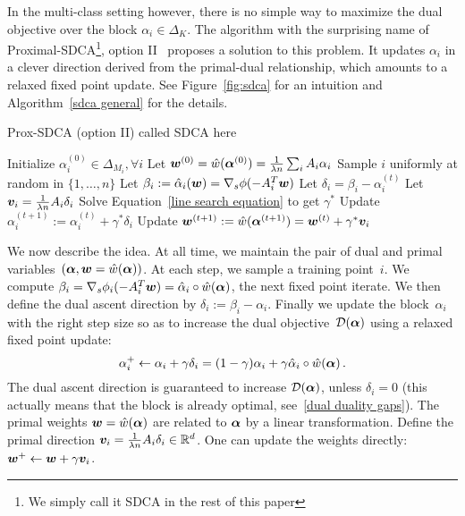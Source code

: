 In the multi-class setting however, there is no simple way to maximize the dual objective over the block $\alpha_i \in \Delta_K$.
The algorithm with the surprising name of Proximal-SDCA\footnote{We simply call it SDCA in the rest of this paper}, option II~\citep{shalev2016accelerated} proposes a solution to this problem.
It updates $\alpha_i$  in a clever direction derived from the primal-dual relationship, which amounts to a relaxed fixed point update. 
See Figure~\ref{fig:sdca} for an intuition 
and Algorithm~\ref{sdca general} for the details.



\begin{algorithm}[t]
    \caption{Prox-SDCA (option II) called SDCA here}%
    \label{sdca general}
	\begin{algorithmic}
        \STATE Initialize $\alpha_i^{(0)} \in \Delta_{M_i}, \forall i$
        \STATE Let $\boldsymbol{w}^{(0)} = \hat{w}(\bm{\alpha}^{(0)}) = \frac{1}{\lambda n} \sum_i A_i \alpha_i$
                \STATE Sample $i$ uniformly at random in $\{1,\ldots,n\}$
                \STATE Let $ \beta_i := \hat{\alpha}_i(\boldsymbol{w}) = \nabla_s \phi(-A_i^T \boldsymbol{w})$
                \STATE Let $\delta_i = \beta_i - \alpha_i^{(t)}$ 
                \STATE Let $\bm v_i = \frac{1}{\lambda n} A_i \delta_i $ 
                \STATE Solve Equation~\eqref{line search equation} to get $\gamma^*$ 
               \STATE Update $\alpha_i^{(t+1)} := \alpha_i^{(t)} + \gamma^* \delta_i$
               \STATE Update $\boldsymbol{w}^{(t+1)} := \hat{w}(\bm{\alpha}^{(t+1)}) = \boldsymbol{w}^{(t)} + \gamma^* \bm v_i $
        \ENDFOR
	\end{algorithmic}
\end{algorithm}


We now describe the idea.
At all time, we maintain the pair of dual and primal variables~$(\boldsymbol{\alpha}, \boldsymbol{w} = \hat w (\boldsymbol{\alpha}))$.
At each step, we sample a training point~$i$.
We compute $\beta_i = \nabla_s \phi_i(-A_i^T \boldsymbol{w}) = \hat \alpha_i \circ \hat w(\boldsymbol{\alpha})$,  the next fixed point iterate.
We then define the dual ascent direction by $\delta_i := \beta_i - \alpha_i$.
Finally we update the block~$\alpha_i$ with the right step size so as to increase the dual objective~${\mathcal D}(\boldsymbol{\alpha})$ using a relaxed fixed point update:
\begin{equation} \label{eq:dual_fixed_pt_update}
	\alpha_i^+ \leftarrow \alpha_i + \gamma \delta_i = (1-\gamma)\alpha_i + \gamma \hat \alpha_i \circ \hat w(\boldsymbol{\alpha}) \, .
\end{equation}
The dual ascent direction is guaranteed to increase ${\mathcal D}(\boldsymbol{\alpha})$, unless $\delta_i = 0$ (this actually means that the block is already optimal, see~\eqref{dual duality gaps}).
The primal weights $\boldsymbol{w} = \hat w (\boldsymbol{\alpha})$ are related to $\boldsymbol{\alpha}$ by a linear transformation.
Define the primal direction $\bm v_i = \frac{1}{\lambda n} A_i \delta_i \in \mathbb{R}^d$.
One can update the weights directly: $\boldsymbol{w}^+ \leftarrow \boldsymbol{w} + \gamma \bm v_i$.

